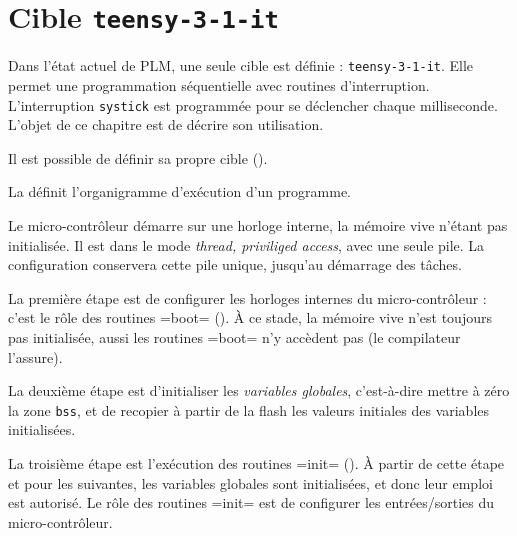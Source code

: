 




\chapter{Cible \texttt{teensy-3-1-it}}

Dans l'état actuel de PLM, une seule cible est définie : \texttt{teensy-3-1-it}.  Elle permet une programmation séquentielle avec routines d'interruption. L'interruption \texttt{systick} est programmée pour se déclencher chaque milliseconde. L'objet de ce chapitre est de décrire son utilisation.

Il est possible de définir sa propre cible ().





















La  définit l'organigramme d'exécution d'un programme.

Le micro-contrôleur démarre sur une horloge interne, la mémoire vive n'étant pas initialisée. Il est dans le mode \emph{thread, priviliged access}, avec une seule pile. La configuration conservera cette pile unique, jusqu'au démarrage des tâches.

La première étape est de configurer les horloges internes du micro-contrôleur : c'est le rôle des routines \plm=boot= (). À ce stade, la mémoire vive n'est toujours pas initialisée, aussi les routines \plm=boot= n'y accèdent pas (le compilateur l'assure).

La deuxième étape est d'initialiser les \emph{variables globales}, c'est-à-dire mettre à zéro la zone \texttt{bss}, et de recopier à partir de la flash les valeurs initiales des variables initialisées.

La troisième étape est l'exécution des routines \plm=init= (). À partir de cette étape et pour les suivantes, les variables globales sont initialisées, et donc leur emploi est autorisé. Le rôle des routines \plm=init= est de configurer les entrées/sorties du micro-contrôleur.

